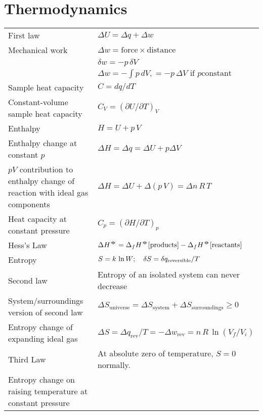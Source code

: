 \documentclass[a4paper, 11pt]{article}
\makeatletter
\DeclareRobustCommand{\ltsym}{{\mbox{%
\def\width{0.8pt}
\hbox to \width{\relax}%
\hbox to 0pt{\hbox to 0pt{\hss\(\circ\)\hss}%
\hbox to 0pt{\hss\(-\)\hss}%
}
\hbox to \width{\relax}%
}}}
\newenvironment{explain}{\color{explain}\def\arraystretch{1.6}\setlength{\tabcolsep}{.05\textwidth}\begin{longtable}{@{}p{.35\textwidth}p{.55\textwidth}}\raggedright}{\end{longtable}}
\makeatother
\begin{document}
\section*{Thermodynamics}
\begin{explain}First law
&
$\Delta U = \Delta q + \Delta w$
\\
Mechanical work
&\color{memorise} $\Delta w = \text{force} \times \text{distance}$
\\
&\color{memorise} $\delta w = -p\,\delta V$
\\
&\color{memorise} $\Delta w = -\int p\,dV, =- p\,\Delta V\text{ if $p$
  constant}$
\\
Sample heat capacity & 
\color{memorise}
$C = dq/dT$
\\
Constant-volume sample heat capacity & 
\color{memorise}
$C_V = (\partial U/\partial T)_V$
\\
Enthalpy
&
\color{memorise}
$H = U + p\, V$
\\
Enthalpy change at constant $p$& $\Delta H = \Delta q=\Delta U + p\Delta V$
\\
$pV$ contribution to enthalpy change of reaction with ideal gas
components
&
$\Delta H = \Delta U + \Delta (p\,V) = \Delta n\, R\,T$
\\
Heat capacity at constant pressure
&
\color{memorise}
$C_p = (\partial H/\partial T)_p$
\\
Hess's Law
&
\color{memorise}
$\Delta H^\ltsym = \Delta_f H^\ltsym[\text{products}]
- \Delta_f H^\ltsym[\text{reactants}]$
\\
Entropy
&
$S = k\,\ln W ;
\color{memorise}
\quad \delta S = \delta q_{\text{reversible}} / T$
\\
Second law & Entropy of an isolated system can never decrease
\\
System/surroundings version of second law
&
\color{memorise}
$\Delta S_{\text{universe}} = \Delta S_{\text{system}} + \Delta S_{\text{surroundings}}
\ge 0$
\\
Entropy change of expanding ideal gas
&
\color{memorise}
$\Delta S = \Delta q_{\text{rev}}/T = - \Delta w_{\text{rev}} = n \, R
\, \ln (V_f/V_i)$
\\
Third Law
& At absolute zero of temperature, $S=0$ normally.
\\
Entropy change on raising temperature at constant pressure
&

\end{explain}
\end{document}
